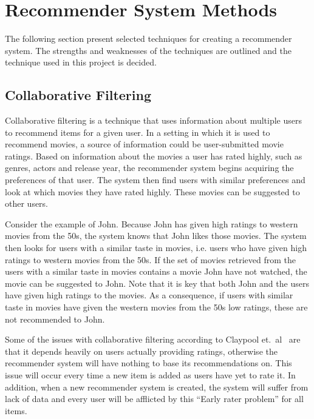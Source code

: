 \section{Recommender System Methods}

The following section present selected techniques for creating a recommender system. The strengths and weaknesses of the techniques are outlined and the technique used in this project is decided.

\subsection{Collaborative Filtering}
\label{sec:analysis:recommender-methods:collaborative-filtering}

Collaborative filtering is a technique that uses information about multiple users to recommend items for a given user.
In a setting in which it is used to recommend movies, a source of information could be user-submitted movie ratings.
Based on information about the movies a user has rated highly, such as genres, actors and release year, the recommender system begins acquiring the preferences of that user.
The system then find users with similar preferences and look at which movies they have rated highly. These movies can be suggested to other users.

Consider the example of John. Because John has given high ratings to western movies from the 50s, the system knows that John likes those movies. The system then looks for users with a similar taste in movies, i.e. users who have given high ratings to western movies from the 50s. If the set of movies retrieved from the users with a similar taste in movies contains a movie John have not watched, the movie can be suggested to John. Note that it is key that both John and the users have given high ratings to the movies. As a consequence, if users with similar taste in movies have given the western movies from the 50s low ratings, these are not recommended to John.

Some of the issues with collaborative filtering according to Claypool et.~al~\cite{claypool1999combining} are that it depends heavily on users actually providing ratings, otherwise the recommender system will have nothing to base its recommendations on. This issue will occur every time a new item is added as users have yet to rate it.
In addition, when a new recommender system is created, the system will suffer from lack of data and every user will be afflicted by this ``Early rater problem'' for all items.

